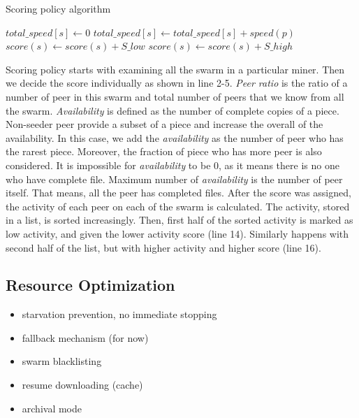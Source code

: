 \begin{algorithm}[h]
	\caption{Scoring policy algorithm}
	\label{alg:scorep}
	\begin{algorithmic}[1]
		\Statex
		\Statex
						\State $total\_speed[s] \gets 0$
				\State $total\_speed[s] \gets total\_speed[s] + speed(p)$
			\EndFor
		\EndFor
		\State {}
				\State $score(s) \gets score(s) + S\_low$
			\Else{\null}
				\State $score(s) \gets score(s) + S\_high$
			\EndIf
		\EndFor
		\State {}
	\end{algorithmic}
\end{algorithm}

Scoring policy starts with examining all the swarm in a particular miner. Then we decide the score individually as shown in line 2-5. \textit{Peer ratio} is the ratio of a number of peer in this swarm and total number of peers that we know from all the swarm. \textit{Availability} is defined as the number of complete copies of a piece. Non-seeder peer provide a subset of a piece and increase the overall of the availability. In this case, we add the \textit{availability} as the number of peer who has the rarest piece. Moreover, the fraction of piece who has more peer is also considered. It is impossible for \textit{availability} to be 0, as it means there is no one who have complete file. Maximum number of \textit{availability} is the number of peer itself. That means, all the peer has completed files. After the score was assigned, the activity of each peer on each of the swarm is calculated. The activity, stored in a list, is sorted increasingly. Then, first half of the sorted activity is marked as low activity, and given the lower activity score (line 14). Similarly happens with second half of the list, but with higher activity and higher score (line 16).

\subsection{Resource Optimization}
\begin{itemize}
	\item starvation prevention, no immediate stopping
	 \item fallback mechanism (for now)
\item 	 swarm blacklisting
\item 	 resume downloading (cache)
\item 	 archival mode
\end{itemize}



